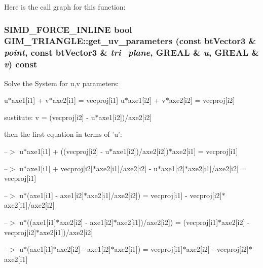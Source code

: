 Here is the call graph for this function:\hypertarget{class_g_i_m___t_r_i_a_n_g_l_e_cbd27931f5431435ecce5576de18924b}{
\subsubsection[get\_\-uv\_\-parameters]{\setlength{\rightskip}{0pt plus 5cm}SIMD\_\-FORCE\_\-INLINE bool GIM\_\-TRIANGLE::get\_\-uv\_\-parameters (const btVector3 \& {\em point}, \/  const btVector3 \& {\em tri\_\-plane}, \/  GREAL \& {\em u}, \/  GREAL \& {\em v}) const}}
\label{class_g_i_m___t_r_i_a_n_g_l_e_cbd27931f5431435ecce5576de18924b}


Solve the System for u,v parameters:

u$\ast$axe1\mbox{[}i1\mbox{]} + v$\ast$axe2\mbox{[}i1\mbox{]} = vecproj\mbox{[}i1\mbox{]} u$\ast$axe1\mbox{[}i2\mbox{]} + v$\ast$axe2\mbox{[}i2\mbox{]} = vecproj\mbox{[}i2\mbox{]}

sustitute: v = (vecproj\mbox{[}i2\mbox{]} - u$\ast$axe1\mbox{[}i2\mbox{]})/axe2\mbox{[}i2\mbox{]}

then the first equation in terms of 'u':

--$>$ u$\ast$axe1\mbox{[}i1\mbox{]} + ((vecproj\mbox{[}i2\mbox{]} - u$\ast$axe1\mbox{[}i2\mbox{]})/axe2\mbox{[}i2\mbox{]})$\ast$axe2\mbox{[}i1\mbox{]} = vecproj\mbox{[}i1\mbox{]}

--$>$ u$\ast$axe1\mbox{[}i1\mbox{]} + vecproj\mbox{[}i2\mbox{]}$\ast$axe2\mbox{[}i1\mbox{]}/axe2\mbox{[}i2\mbox{]} - u$\ast$axe1\mbox{[}i2\mbox{]}$\ast$axe2\mbox{[}i1\mbox{]}/axe2\mbox{[}i2\mbox{]} = vecproj\mbox{[}i1\mbox{]}

--$>$ u$\ast$(axe1\mbox{[}i1\mbox{]} - axe1\mbox{[}i2\mbox{]}$\ast$axe2\mbox{[}i1\mbox{]}/axe2\mbox{[}i2\mbox{]}) = vecproj\mbox{[}i1\mbox{]} - vecproj\mbox{[}i2\mbox{]}$\ast$axe2\mbox{[}i1\mbox{]}/axe2\mbox{[}i2\mbox{]}

--$>$ u$\ast$((axe1\mbox{[}i1\mbox{]}$\ast$axe2\mbox{[}i2\mbox{]} - axe1\mbox{[}i2\mbox{]}$\ast$axe2\mbox{[}i1\mbox{]})/axe2\mbox{[}i2\mbox{]}) = (vecproj\mbox{[}i1\mbox{]}$\ast$axe2\mbox{[}i2\mbox{]} - vecproj\mbox{[}i2\mbox{]}$\ast$axe2\mbox{[}i1\mbox{]})/axe2\mbox{[}i2\mbox{]}

--$>$ u$\ast$(axe1\mbox{[}i1\mbox{]}$\ast$axe2\mbox{[}i2\mbox{]} - axe1\mbox{[}i2\mbox{]}$\ast$axe2\mbox{[}i1\mbox{]}) = vecproj\mbox{[}i1\mbox{]}$\ast$axe2\mbox{[}i2\mbox{]} - vecproj\mbox{[}i2\mbox{]}$\ast$axe2\mbox{[}i1\mbox{]}

